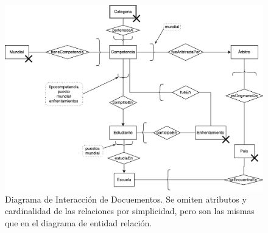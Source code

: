 
\begin{figure}[H]
  \centering
  \includegraphics[width=\textwidth]{img/did.pdf}
  \caption{Diagrama de Interacción de Docuementos. Se omiten atributos y cardinalidad de las relaciones por simplicidad, pero son las mismas que en el diagrama de entidad relación.}
\end{figure}


